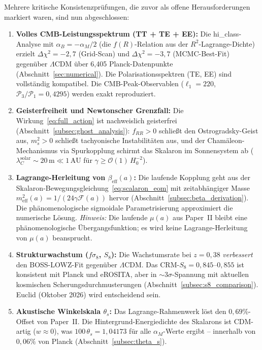 \documentclass[11pt,a4paper]{article}
\begin{document}
Mehrere kritische Konsistenzpr\"ufungen, die zuvor als offene Herausforderungen markiert waren, sind nun abgeschlossen:

\begin{enumerate}
\item \textbf{Volles CMB-Leistungsspektrum (TT + TE + EE):} Die hi\_class-Analyse mit $\alpha_B = -\alpha_M/2$ (die $f(R)$-Relation aus der $R^2$-Lagrange-Dichte) erzielt $\Delta\chi^2 = -2{,}7$ (Grid-Scan) und $\Delta\chi^2 = -3{,}7$ (MCMC-Best-Fit) gegen\"uber $\Lambda$CDM \"uber 6{,}405 Planck-Datenpunkte (Abschnitt~\ref{sec:numerical}). Die Polarisationsspektren (TE, EE) sind vollst\"andig kompatibel. Die CMB-Peak-Observablen ($\ell_1 = 220$, $\mathcal{P}_3/\mathcal{P}_1 = 0{,}4295$) werden exakt reproduziert.

\item \textbf{Geisterfreiheit und Newtonscher Grenzfall:} Die Wirkung~\eqref{eq:full_action} ist nachweislich geisterfrei (Abschnitt~\ref{subsec:ghost_analysis}): $f_{RR} > 0$ schlie\ss t den Ostrogradsky-Geist aus, $m_s^2 > 0$ schlie\ss t tachyonische Instabilit\"aten aus, und der Cham\"aleon-Mechanismus via Spurkopplung schirmt das Skalaron im Sonnensystem ab ($\lambda_C^{\mathrm{solar}} \sim 20\,\mathrm{m} \ll 1\,\mathrm{AU}$ f\"ur $\gamma \geq \mathcal{O}(1)\,H_0^{-2}$).

\item \textbf{Lagrange-Herleitung von $\beta_{\mathrm{eff}}(a)$:} Die laufende Kopplung geht aus der Skalaron-Bewegungsgleichung~\eqref{eq:scalaron_eom} mit zeitabh\"angiger Masse $m_{\mathrm{eff}}^2(a) = 1/(24\gamma\mathcal{F}(a))$ hervor (Abschnitt~\ref{subsec:beta_derivation}). Die ph\"anomenologische sigmoidale Parametrisierung approximiert die numerische L\"osung. \textit{Hinweis:} Die laufende $\mu(a)$ aus Paper~II bleibt eine ph\"anomenologische \"Ubergangsfunktion; es wird keine Lagrange-Herleitung von $\mu(a)$ beansprucht.

\item \textbf{Strukturwachstum ($f\sigma_8$, $S_8$):} Die Wachstumsrate bei $z = 0{,}38$ \textit{verbessert} den BOSS-LOWZ-Fit gegen\"uber $\Lambda$CDM. Das CRM-$S_8 = 0{,}845$--$0{,}855$ ist konsistent mit Planck und eROSITA, aber in $\sim 3\sigma$-Spannung mit aktuellen kosmischen Scherungsdurchmusterungen (Abschnitt~\ref{subsec:s8_comparison}). Euclid (Oktober 2026) wird entscheidend sein.

\item \textbf{Akustische Winkelskala $\theta_s$:} Das Lagrange-Rahmenwerk l\"ost den $0{,}69\%$-Offset von Paper~II. Die Hintergrund-Energiedichte des Skalarons ist CDM-artig ($w \approx 0$), was $100\,\theta_s = 1{,}04173$ f\"ur alle $\alpha_M$-Werte ergibt -- innerhalb von $0{,}06\%$ von Planck (Abschnitt~\ref{subsec:theta_s}).


\end{enumerate}
\end{document}
